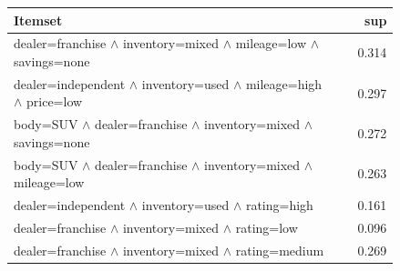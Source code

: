 \begin{tabular}{@{}>{\raggedright\arraybackslash}p{0.84\linewidth}r@{}}
\toprule
Itemset & sup \\
\midrule
dealer=franchise $\wedge$ inventory=mixed $\wedge$ mileage=low $\wedge$ savings=none & 0.314 \\
dealer=independent $\wedge$ inventory=used $\wedge$ mileage=high $\wedge$ price=low & 0.297 \\
body=SUV $\wedge$ dealer=franchise $\wedge$ inventory=mixed $\wedge$ savings=none & 0.272 \\
body=SUV $\wedge$ dealer=franchise $\wedge$ inventory=mixed $\wedge$ mileage=low & 0.263 \\
\midrule
dealer=independent $\wedge$ inventory=used $\wedge$ rating=high & 0.161 \\
dealer=franchise $\wedge$ inventory=mixed $\wedge$ rating=low & 0.096 \\
dealer=franchise $\wedge$ inventory=mixed $\wedge$ rating=medium & 0.269 \\
\bottomrule
\end{tabular}
